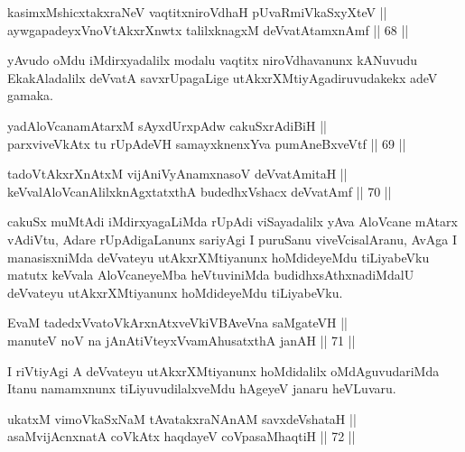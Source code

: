 
\begin{shl}
kasimxMshicxtakxraNeV vaqtitxniroVdhaH pUvaRmiVkaSxyXteV || \\
aywgapadeyxVnoVtAkxrXnwtx talilxknagxM deVvatAtamxnAmf \hfill || 68 ||  
\end{shl}

\begin{artha}
yAvudo oMdu iMdirxyadalilx modalu vaqtitx niroVdhavanunx kANuvudu
EkakAladalilx deVvatA savxrUpagaLige utAkxrXMtiyAgadiruvudakekx adeV
gamaka.
\end{artha}

\begin{shl}
yadA\s \s loVcanamAtarxM sAyxdUrxpAdw cakuSxrAdiBiH || \\
parxviveVkAtx tu rUpAdeVH samayxknenxYva pumAneBxveVtf \hfill || 69 ||  
\end{shl}

\begin{shl}
tadoVtAkxrXnAtxM vijAniVyAnamxnasoV deVvatAmitaH || \\
keVvalAloVcanAlilxknAgxtatxthA budedhxVshacx deVvatAmf \hfill || 70 ||  
\end{shl}

\begin{artha}
cakuSx muMtAdi iMdirxyagaLiMda rUpAdi viSayadalilx yAva AloVcane
mAtarx vAdiVtu, Adare rUpAdigaLanunx sariyAgi I puruSanu
viveVcisalAranu, AvAga I manasisxniMda deVvateyu utAkxrXMtiyanunx
hoMdideyeMdu tiLiyabeVku matutx keVvala AloVcaneyeMba heVtuviniMda
budidhxsAthxnadiMdalU deVvateyu utAkxrXMtiyanunx hoMdideyeMdu
tiLiyabeVku.
\end{artha}

\begin{shl}
EvaM tadedxVvatoVkArxnAtxveVkiVBAveVna saMgateVH || \\
manuteV noV na jAnAtiVteyxVvamAhusatxthA janAH \hfill || 71 ||  
\end{shl}

\begin{artha}
I riVtiyAgi A deVvateyu utAkxrXMtiyanunx hoMdidalilx oMdAguvudariMda
Itanu namamxnunx tiLiyuvudilalxveMdu hAgeyeV janaru heVLuvaru.
\end{artha}

\begin{shl}
ukatxM vimoVkaSxNaM tAvatakxraNAnAM savxdeVshataH || \\
asaMvijAcnxnatA coVkAtx haqdayeV coVpasaMhaqtiH \hfill || 72 ||  
\end{shl}

